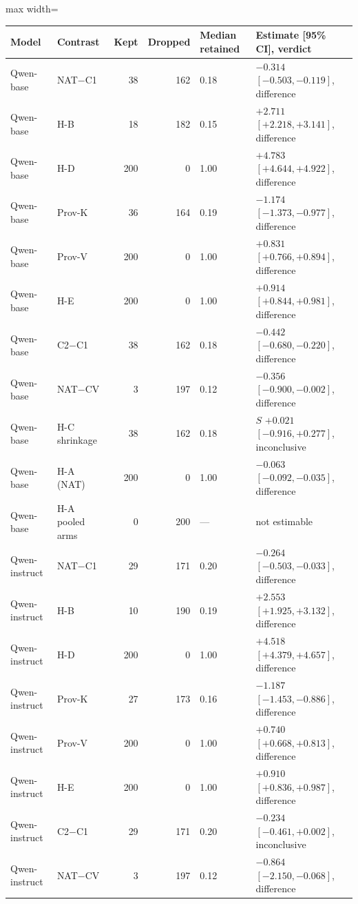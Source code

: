 \begin{table}[!htbp]
\centering\scriptsize
\begin{adjustbox}{max width=\linewidth}\begin{tabular}{@{}l l r r l l@{}}
\toprule
Model & Contrast & Kept & Dropped & Median retained & Estimate [95\% CI], verdict \\
\midrule
Qwen-base & NAT$-$C1 & 38 & 162 & 0.18 & $-0.314$ $[-0.503, -0.119]$, difference \\
Qwen-base & H-B & 18 & 182 & 0.15 & $+2.711$ $[+2.218, +3.141]$, difference \\
Qwen-base & H-D & 200 & 0 & 1.00 & $+4.783$ $[+4.644, +4.922]$, difference \\
Qwen-base & Prov-K & 36 & 164 & 0.19 & $-1.174$ $[-1.373, -0.977]$, difference \\
Qwen-base & Prov-V & 200 & 0 & 1.00 & $+0.831$ $[+0.766, +0.894]$, difference \\
Qwen-base & H-E & 200 & 0 & 1.00 & $+0.914$ $[+0.844, +0.981]$, difference \\
Qwen-base & C2$-$C1 & 38 & 162 & 0.18 & $-0.442$ $[-0.680, -0.220]$, difference \\
Qwen-base & NAT$-$CV & 3 & 197 & 0.12 & $-0.356$ $[-0.900, -0.002]$, difference \\
Qwen-base & H-C shrinkage & 38 & 162 & 0.18 & $S$ $+0.021$ $[-0.916, +0.277]$, inconclusive \\
Qwen-base & H-A (NAT) & 200 & 0 & 1.00 & $-0.063$ $[-0.092, -0.035]$, difference \\
Qwen-base & H-A pooled arms & 0 & 200 & --- & not estimable \\
\midrule
Qwen-instruct & NAT$-$C1 & 29 & 171 & 0.20 & $-0.264$ $[-0.503, -0.033]$, difference \\
Qwen-instruct & H-B & 10 & 190 & 0.19 & $+2.553$ $[+1.925, +3.132]$, difference \\
Qwen-instruct & H-D & 200 & 0 & 1.00 & $+4.518$ $[+4.379, +4.657]$, difference \\
Qwen-instruct & Prov-K & 27 & 173 & 0.16 & $-1.187$ $[-1.453, -0.886]$, difference \\
Qwen-instruct & Prov-V & 200 & 0 & 1.00 & $+0.740$ $[+0.668, +0.813]$, difference \\
Qwen-instruct & H-E & 200 & 0 & 1.00 & $+0.910$ $[+0.836, +0.987]$, difference \\
Qwen-instruct & C2$-$C1 & 29 & 171 & 0.20 & $-0.234$ $[-0.461, +0.002]$, inconclusive \\
Qwen-instruct & NAT$-$CV & 3 & 197 & 0.12 & $-0.864$ $[-2.150, -0.068]$, difference \\

\end{tabular}
\end{adjustbox}
\end{table}
